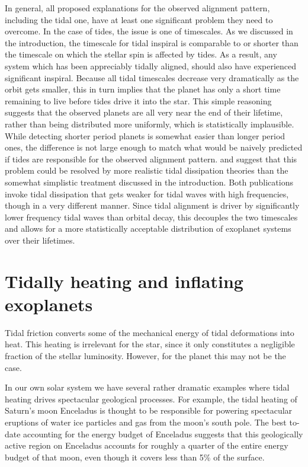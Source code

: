 In general, all proposed explanations for the observed alignment pattern,
including the tidal one, have at least one significant problem they need to
overcome. In the case of tides, the issue is one of timescales. As we discussed
in the introduction, the timescale for tidal inspiral is comparable to or
shorter than the timescale on which the stellar spin is affected by tides. As a
result, any system which has been appreciably tidally aligned, should also have
experienced significant inspiral. Because all tidal timescales decrease very
dramatically as the orbit gets smaller, this in turn implies that the planet has
only a short time remaining to live before tides drive it into the star. This
simple reasoning suggests that the observed planets are all very near the end of
their lifetime, rather than being distributed more uniformly, which is
statistically implausible. While detecting shorter period planets is somewhat
easier than longer period ones, the difference is not large enough to match what
would be naively predicted if tides are responsible for the observed alignment
pattern. \citet{Lai_12} and \citet{Anderson_et_al_21} suggest that this problem
could be resolved by more realistic tidal dissipation theories than the somewhat
simplistic treatment discussed in the introduction. Both publications invoke
tidal dissipation that gets weaker for tidal waves with high frequencies, though
in a very different manner. Since tidal alignment is driver by significantly
lower frequency tidal waves than orbital decay, this decouples the two
timescales and allows for a more statistically acceptable distribution of
exoplanet systems over their lifetimes.

\section{Tidally heating and inflating exoplanets}

Tidal friction converts some of the mechanical energy of tidal deformations into
heat. This heating is irrelevant for the star, since it only constitutes a
negligible fraction of the stellar luminosity. However, for the planet this may
not be the case.

In our own solar system we have several rather dramatic examples where
tidal heating drives spectacular geological processes. For example, the tidal
heating of Saturn's moon Enceladus is thought to be responsible for powering
spectacular eruptions of water ice particles and gas from the moon's south pole.
The best to-date accounting for the energy budget of Enceladus suggests that
this geologically active region on Enceladus accounts for roughly a quarter of
the entire energy budget of that moon, even though it covers less than 5\% of
the surface.

